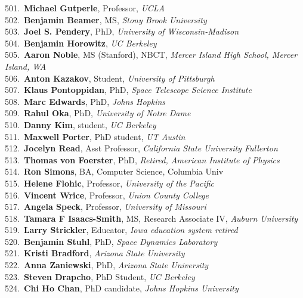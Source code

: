 501.~{\bf Michael Gutperle}, Professor, {\sl UCLA} \\
502.~{\bf Benjamin Beamer}, MS, {\sl Stony Brook University} \\
503.~{\bf Joel S. Pendery}, PhD, {\sl University of Wisconsin-Madison} \\
504.~{\bf Benjamin Horowitz}, {\sl UC Berkeley} \\
505.~{\bf Aaron Noble}, MS (Stanford), NBCT, {\sl Mercer Island High School, Mercer Island, WA} \\
506.~{\bf Anton Kazakov}, Student, {\sl University of Pittsburgh} \\
507.~{\bf Klaus Pontoppidan}, PhD, {\sl Space Telescope Science Institute} \\
508.~{\bf Marc Edwards}, PhD, {\sl Johns Hopkins} \\
509.~{\bf Rahul Oka}, PhD, {\sl University of Notre Dame} \\
510.~{\bf Danny Kim}, student, {\sl UC Berkeley} \\
511.~{\bf Maxwell Porter}, PhD student, {\sl UT Austin} \\
512.~{\bf Jocelyn Read}, Asst Professor, {\sl California State University Fullerton} \\
513.~{\bf Thomas von Foerster}, PhD, {\sl Retired, American Institute of Physics} \\
514.~{\bf Ron Simons}, BA, Computer Science, Columbia Univ \\
515.~{\bf Helene Flohic}, Professor, {\sl University of the Pacific} \\
516.~{\bf Vincent Wrice}, Professor, {\sl Union County College} \\
517.~{\bf Angela Speck}, Professor, {\sl University of Missouri} \\
518.~{\bf Tamara F Isaacs-Smith}, MS, Research Associate IV, {\sl Auburn University} \\
519.~{\bf Larry Strickler}, Educator, {\sl Iowa education system retired} \\
520.~{\bf Benjamin Stuhl}, PhD, {\sl Space Dynamics Laboratory} \\
521.~{\bf Kristi Bradford}, {\sl Arizona State University} \\
522.~{\bf Anna Zaniewski}, PhD, {\sl Arizona State University} \\
523.~{\bf Steven Drapcho}, PhD Student, {\sl UC Berkeley} \\
524.~{\bf Chi Ho Chan}, PhD candidate, {\sl Johns Hopkins University} \\
